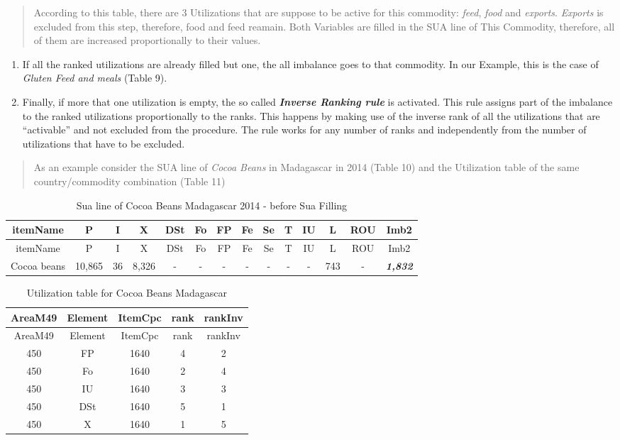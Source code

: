 \documentclass[]{article}
\begin{document}
\begin{quote}
According to this table, there are 3 Utilizations that are suppose to be
active for this commodity: \emph{feed}, \emph{food} and \emph{exports}.
\emph{Exports} is excluded from this step, therefore, food and feed
reamain. Both Variables are filled in the SUA line of This Commodity,
therefore, all of them are increased proportionally to their values.
\end{quote}

\begin{enumerate}
\def\labelenumi{\arabic{enumi}.}
\setcounter{enumi}{1}
\item
  If all the ranked utilizations are already filled but one, the all
  imbalance goes to that commodity. In our Example, this is the case of
  \emph{Gluten Feed and meals} (Table 9).
\item
  Finally, if more that one utilization is empty, the so called
  \textbf{\emph{Inverse Ranking rule}} is activated. This rule assigns
  part of the imbalance to the ranked utilizations proportionally to the
  ranks. This happens by making use of the inverse rank of all the
  utilizations that are ``activable'' and not excluded from the
  procedure. The rule works for any number of ranks and independently
  from the number of utilizations that have to be excluded.
\end{enumerate}

\begin{quote}
As an example consider the SUA line of \emph{Cocoa Beans} in Madagascar
in 2014 (Table 10) and the Utilization table of the same
country/commodity combination (Table 11)
\end{quote}

\begin{longtable}[]{@{}cccccccccccccc@{}}
\caption{Sua line of Cocoa Beans Madagascar 2014 - before Sua
Filling}\tabularnewline
\toprule
itemName & P & I & X & DSt & Fo & FP & Fe & Se & T & IU & L & ROU &
Imb2\tabularnewline
\midrule
\endfirsthead
\toprule
itemName & P & I & X & DSt & Fo & FP & Fe & Se & T & IU & L & ROU &
Imb2\tabularnewline
\midrule
\endhead
Cocoa beans & 10,865 & 36 & 8,326 & - & - & - & - & - & - & - & 743 & -
& \textbf{\emph{1,832}}\tabularnewline
\bottomrule
\end{longtable}

\begin{longtable}[]{@{}ccccc@{}}
\caption{Utilization table for Cocoa Beans Madagascar}\tabularnewline
\toprule
AreaM49 & Element & ItemCpc & rank & rankInv\tabularnewline
\midrule
\endfirsthead
\toprule
AreaM49 & Element & ItemCpc & rank & rankInv\tabularnewline
\midrule
\endhead
450 & FP & 1640 & 4 & 2\tabularnewline
450 & Fo & 1640 & 2 & 4\tabularnewline
450 & IU & 1640 & 3 & 3\tabularnewline
450 & DSt & 1640 & 5 & 1\tabularnewline
450 & X & 1640 & 1 & 5\tabularnewline
\bottomrule
\end{longtable}
\end{document}
